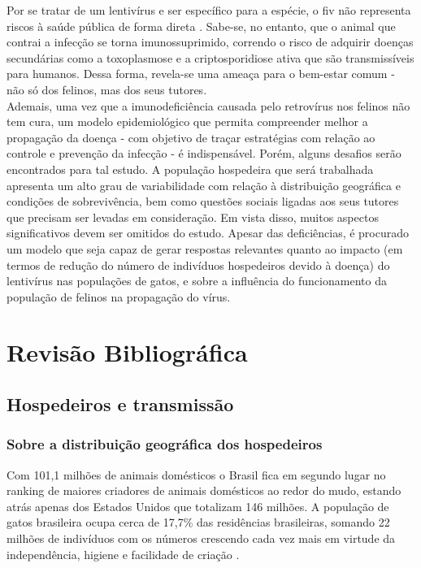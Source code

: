 \documentclass{article}
\begin{document}
\noindent Por se tratar de um lentivírus e ser específico para a espécie, o \gls{fiv} não representa riscos à saúde pública de forma direta . Sabe-se, no entanto, que o animal que contrai a infecção se torna imunossuprimido, correndo o risco de adquirir doenças secundárias como a toxoplasmose e a criptosporidiose ativa que são transmissíveis para humanos. Dessa forma, revela-se uma ameaça para o bem-estar comum - não só dos felinos, mas dos seus tutores\cite{rayane}. \\

\noindent Ademais, uma vez que a imunodeficiência causada pelo retrovírus nos felinos não tem cura, um modelo epidemiológico que permita compreender melhor a propagação da doença - com objetivo de traçar estratégias com relação ao
controle e prevenção da infecção - é indispensável.
Porém, alguns desafios serão encontrados para tal estudo. A população hospedeira que será trabalhada apresenta um alto grau de variabilidade com relação à distribuição geográfica e condições de sobrevivência, bem como questões sociais ligadas aos seus tutores que precisam ser levadas em consideração. Em vista disso, muitos aspectos significativos devem ser omitidos do estudo. Apesar das deficiências, é procurado um modelo que seja capaz de gerar respostas relevantes quanto ao impacto (em termos de redução do número de indivíduos hospedeiros devido à doença) do lentivírus nas populações de gatos, e sobre a influência do funcionamento da população de felinos na propagação do vírus.  \\

\newpage
\section{Revisão Bibliográfica}
\subsection{Hospedeiros e transmissão} 
\subsubsection{Sobre a distribuição geográfica dos hospedeiros}
Com 101,1 milhões de animais domésticos o Brasil fica em segundo lugar no ranking de maiores criadores de animais domésticos ao redor do mudo, estando atrás apenas dos Estados Unidos que totalizam 146 milhões. A população de gatos brasileira ocupa cerca de 17,7\%  das residências brasileiras, somando 22 milhões de indivíduos com os números crescendo cada vez mais em virtude da independência, higiene e facilidade de criação \cite{gomes}.\\
\end{document}
